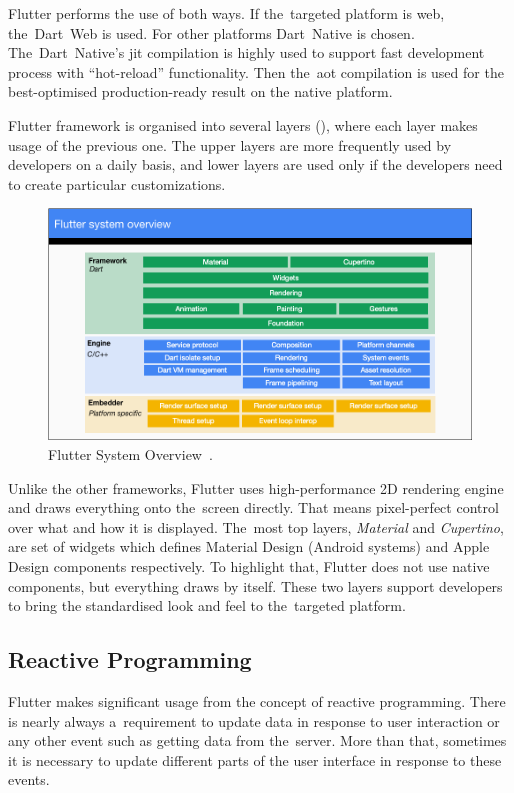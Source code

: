 Flutter performs the use of both ways. If the~targeted platform is web, the~Dart~Web is used. For other platforms Dart~Native is chosen. The~Dart~Native's \gls{jit} compilation is highly used to support fast development process with ``hot-reload'' functionality. Then the~\gls{aot} compilation is used for the best-optimised production-ready result on the native platform.  

Flutter framework is organised into several layers (), where each layer makes usage of the previous one. The upper layers are more frequently used by developers on a daily basis, and lower layers are used only if the developers need to create particular customizations. 

\begin{figure}[htp]
    \centering
    \includegraphics[width=\linewidth]{img/flutter/flutter-layer-cake.png}
    \caption{Flutter System Overview~\cite{flutter-technical-overview}.}
    \label{fig:flutter-layer-cake}
\end{figure}

Unlike the other frameworks, Flutter uses high-performance 2D rendering engine and draws everything onto the~screen directly. That means pixel-perfect control over what and how it is displayed. The~most top layers, \textit{Material} and \textit{Cupertino}, are set of widgets which defines Material Design (Android systems) and Apple Design components respectively. To highlight that, Flutter does not use native components, but everything draws by itself. These two layers support developers to bring the standardised look and feel to the~targeted platform.
\subsection{Reactive Programming}
Flutter makes significant usage from the concept of reactive programming. There is nearly always a~requirement to update data in response to user interaction or any other event such as getting data from the~server. More than that, sometimes it is necessary to update different parts of the user interface in response to these events. 

